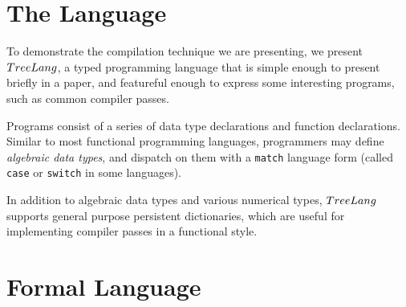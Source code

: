 \documentclass[preprint,10pt,nocopyrightspace,nonatbib]{./bibs/sigplanconf}
\begin{document}
\section{The \treelang{} Language}


To demonstrate the compilation technique we are presenting, we present
$TreeLang{}$, a typed programming language that is simple enough to
present briefly in a paper, and featureful enough to express some
interesting programs, such as common compiler passes.

Programs consist of a series of data type declarations and function
declarations. Similar to most functional programming languages,
programmers may define \emph{algebraic data types}, and dispatch on
them with a \texttt{match} language form (called \texttt{case} or
\texttt{switch} in some languages).





In addition to algebraic data types and various numerical types, $TreeLang{}$ supports
general purpose persistent dictionaries, which are useful for implementing compiler
passes in a functional style.



\section{Formal Language}
\end{document}
